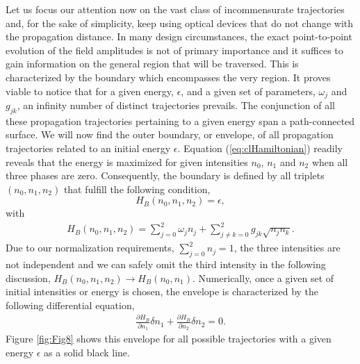 \documentclass[9pt,twocolumn,twoside]{osajnl}
\begin{document}
Let us focus our attention now on the vast class of incommensurate trajectories and, for the sake of simplicity, keep using optical devices that do not change with the propagation distance.
In many design circumstances, the exact point-to-point evolution of the field amplitudes is not of primary importance and it suffices to gain information on the general region that will be traversed. 
This is characterized by the boundary which encompasses the very region. 
It proves viable to notice that for a given energy, $\epsilon$, and a given set of parameters, $\omega_{j}$ and $g_{jk}$, an infinity number of distinct trajectories prevails.
The conjunction of all these propagation trajectories pertaining to a given energy span a path-connected surface.
We will now find the outer boundary, or envelope, of all propagation trajectories related to an initial energy $\epsilon$.
Equation (\ref{eq:clHamiltonian}) readily reveals that the energy is maximized for given intensities $n_0$, $n_1$ and $n_2$ when all three phases are zero. 
Consequently, the boundary is defined by all triplets $\left( n_0,n_1,n_2 \right)$ that fulfill the following condition,
\begin{equation}
	H_{B}(n_0,n_1,n_2) = \epsilon,	
\end{equation}
with 
\begin{eqnarray}
H_{B}(n_0,n_1,n_2) = \sum_{j=0}^{2} \omega_{j} n_{j}  
	+ \sum_{j \neq k = 0}^{2} g_{jk} \sqrt{n_{j} n_{k}}.
\end{eqnarray}
Due to our normalization requirements, $\sum_{j=0}^{2} n_{j} = 1$, the three intensities are not independent and we can safely omit the third intensity in the following discussion,  
$H_{B}(n_0,n_1,n_2) \rightarrow H_{B}(n_0,n_1)$.
Numerically, once a given set of initial intensities or energy is chosen, the envelope is characterized by the following differential equation,
\begin{eqnarray}
	\frac{\partial H_{B}}{\partial n_1}\delta n_1 + 
	\frac{\partial H_{B}}{\partial n_2}\delta n_2 = 0.
\end{eqnarray}
Figure \ref{fig:Fig8} shows this envelope for all possible trajectories with a given energy $\epsilon$ as a solid black line.
\end{document}
